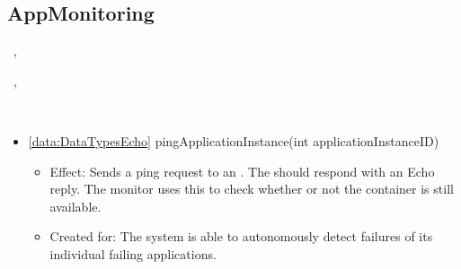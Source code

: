   \subsection{AppMonitoring}\label{int:OnlineServiceOnlineServiceApplicationManagerApplicationContainerAppMonitoring}
    \begin{description}
      \item[Provided by:] \iconcomponent{}~, \iconcomponent{}~
      \item[Required by:] \iconcomponent{}~, \iconcomponent{}~
      \item[Operations:] ~
    \begin{itemize}[noitemsep,nolistsep,leftmargin=-.25cm]
      \item \textsf{\ref{data:DataTypesEcho} pingApplicationInstance(int applicationInstanceID)}
        \begin{itemize}[noitemsep,nolistsep]
           \item Effect: Sends a ping request to an . The  should respond with an Echo reply. The monitor uses this to check whether or not the container is still available.
\item Created for: The system is able to autonomously detect failures of its individual failing applications.
        \end{itemize}
    \end{itemize}
    \end{description}

